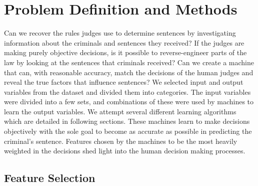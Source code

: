 \documentclass[11pt,letter]{article}
\begin{document}
\section{Problem Definition and Methods}
Can we recover the rules judges use to determine sentences by investigating information about the criminals and sentences they received? If the judges are making purely objective decisions, is it possible to reverse-engineer parts of the law by looking at the sentences that criminals received? Can we create a machine that can, with reasonable accuracy, match the decisions of the human judges and reveal the true factors that influence sentences?
We selected input and output variables from the dataset and divided them into categories. The input variables were divided into a few sets, and combinations of these were used by machines to learn the output variables. We attempt several different learning algorithms which are detailed in following sections. These machines learn to make decisions objectively with the sole goal to become as accurate as possible in predicting the criminal's sentence. Features chosen by the machines to be the most heavily weighted in the decisions shed light into the human decision making processes. 

\subsection{Feature Selection}
\end{document}
